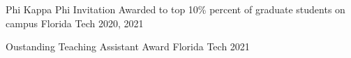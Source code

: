 \begin{cvhonors}
	\cvhonor
	{Phi Kappa Phi Invitation}
	{Awarded to top 10\% percent of graduate students on campus}
	{Florida Tech}
	{2020, 2021}
	
	\cvhonor
	{Oustanding Teaching Assistant Award}
	{}
	{Florida Tech}
	{2021}
	
\end{cvhonors}
